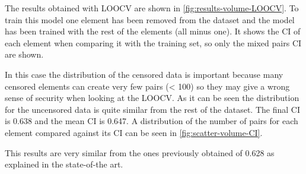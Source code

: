 The results obtained with \gls{LOOCV} are shown in \autoref{fig:results-volume-LOOCV}. 
To train this model one element has been removed from the dataset and the model has 
been trained with the rest of the elements (all minus one). It shows the \gls{CI} of each
element when comparing it with the training set, so only the mixed pairs \gls{CI} are shown.

In this case the distribution of the censored data is important because many censored elements
can create very few pairs (< 100) so they may give a wrong sense of security when looking at
the \gls{LOOCV}. As it can be seen the 
distribution for the uncensored data is quite similar from the rest of the dataset. 
The final \gls{CI} is 0.638 and the mean \gls{CI} is 0.647. A distribution of the number of
pairs for each element compared against its \gls{CI} can be seen in \autoref{fig:scatter-volume-CI}.

This results are very similar from the ones previously obtained of 0.628 as explained in the
state-of-the art.

